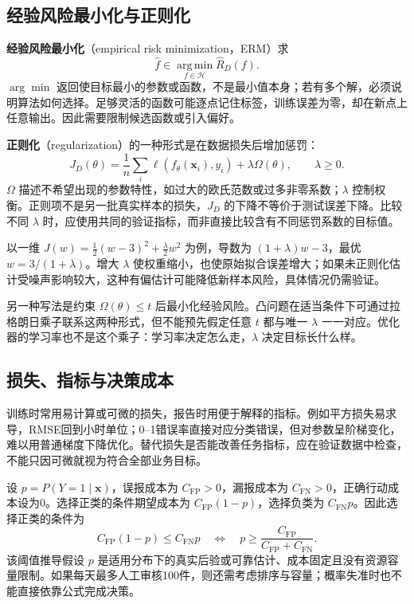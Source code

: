 \documentclass[UTF8,fontset=none,zihao=-4,a4paper]{ctexart}
\newcommand{\term}[1]{\textbf{#1}}
\numberwithin{equation}{section}
\numberwithin{figure}{section}
\begin{document}
\subsection{经验风险最小化与正则化}
\term{经验风险最小化}（empirical risk minimization，ERM）求
\[
 \widehat f\in\operatorname*{arg\,min}_{f\in\mathcal H}\widehat R_D(f).
\]
$\arg\min$ 返回使目标最小的参数或函数，不是最小值本身；若有多个解，必须说明算法如何选择。足够灵活的函数可能逐点记住标签，训练误差为零，却在新点上任意输出。因此需要限制候选函数或引入偏好。

\term{正则化}（regularization）的一种形式是在数据损失后增加惩罚：
\begin{equation}
 J_D(\theta)=\frac1n\sum_i\ell(f_\theta(\symbf x_i),y_i)+\lambda\Omega(\theta),\qquad\lambda\geq0.
\end{equation}
$\Omega$ 描述不希望出现的参数特性，如过大的欧氏范数或过多非零系数；$\lambda$ 控制权衡。正则项不是另一批真实样本的损失，$J_D$ 的下降不等价于测试误差下降。比较不同 $\lambda$ 时，应使用共同的验证指标，而非直接比较含有不同惩罚系数的目标值。

以一维 $J(w)=\tfrac12(w-3)^2+\tfrac\lambda2w^2$ 为例，导数为 $(1+\lambda)w-3$，最优 $w=3/(1+\lambda)$。增大 $\lambda$ 使权重缩小，也使原始拟合误差增大；如果未正则化估计受噪声影响较大，这种有偏估计可能降低新样本风险，具体情况仍需验证。

另一种写法是约束 $\Omega(\theta)\leq t$ 后最小化经验风险。凸问题在适当条件下可通过拉格朗日乘子联系这两种形式，但不能预先假定任意 $t$ 都与唯一 $\lambda$ 一一对应。优化器的学习率也不是这个乘子：学习率决定怎么走，$\lambda$ 决定目标长什么样。

\subsection{损失、指标与决策成本}
训练时常用易计算或可微的损失，报告时用便于解释的指标。例如平方损失易求导，RMSE回到小时单位；0--1错误率直接对应分类错误，但对参数呈阶梯变化，难以用普通梯度下降优化。替代损失是否能改善任务指标，应在验证数据中检查，不能只因可微就视为符合全部业务目标。

设 $p=P(Y=1\mid\symbf x)$，误报成本为 $C_{\mathrm{FP}}>0$，漏报成本为 $C_{\mathrm{FN}}>0$，正确行动成本设为0。选择正类的条件期望成本为 $C_{\mathrm{FP}}(1-p)$，选择负类为 $C_{\mathrm{FN}}p$。因此选择正类的条件为
\[
 C_{\mathrm{FP}}(1-p)\leq C_{\mathrm{FN}}p
 \quad\Longleftrightarrow\quad
 p\geq\frac{C_{\mathrm{FP}}}{C_{\mathrm{FP}}+C_{\mathrm{FN}}}.
\]
该阈值推导假设 $p$ 是适用分布下的真实后验或可靠估计、成本固定且没有资源容量限制。如果每天最多人工审核100件，则还需考虑排序与容量；概率失准时也不能直接依靠公式完成决策。
\end{document}
